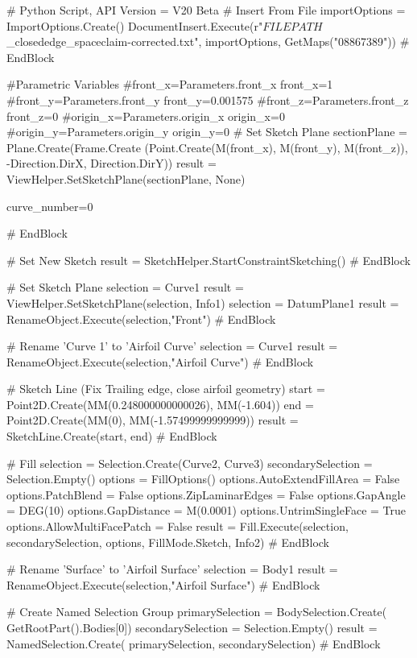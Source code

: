# Python Script, API Version = V20 Beta
# Insert From File
importOptions = ImportOptions.Create()
DocumentInsert.Execute(r"$FILEPATH$
_closededge_spaceclaim-corrected.txt", importOptions, 
GetMaps("08867389"))
# EndBlock

#Parametric Variables
#front_x=Parameters.front_x
front_x=1
#front_y=Parameters.front_y
front_y=0.001575
#front_z=Parameters.front_z
front_z=0
#origin_x=Parameters.origin_x
origin_x=0
#origin_y=Parameters.origin_y
origin_y=0
# Set Sketch Plane
sectionPlane = Plane.Create(Frame.Create
                            (Point.Create(M(front_x), 
                            M(front_y), M(front_z)), 
-Direction.DirX, 
Direction.DirY))
result = ViewHelper.SetSketchPlane(sectionPlane, None)

curve_number=0


# EndBlock


# Set New Sketch
result = SketchHelper.StartConstraintSketching()
# EndBlock

# Set Sketch Plane
selection = Curve1
result = ViewHelper.SetSketchPlane(selection, Info1)
selection = DatumPlane1
result = RenameObject.Execute(selection,"Front")
# EndBlock


# Rename 'Curve 1' to 'Airfoil Curve'
selection = Curve1
result = RenameObject.Execute(selection,"Airfoil Curve")
# EndBlock




# Sketch Line (Fix Trailing edge, close airfoil geometry)
start = Point2D.Create(MM(0.248000000000026), MM(-1.604))
end = Point2D.Create(MM(0), MM(-1.57499999999999))
result = SketchLine.Create(start, end)
# EndBlock


# Fill
selection = Selection.Create(Curve2, Curve3)
secondarySelection = Selection.Empty()
options = FillOptions()
options.AutoExtendFillArea = False
options.PatchBlend = False
options.ZipLaminarEdges = False
options.GapAngle = DEG(10)
options.GapDistance = M(0.0001)
options.UntrimSingleFace = True
options.AllowMultiFacePatch = False
result = Fill.Execute(selection, 
                      secondarySelection, options, 
                      FillMode.Sketch, Info2)
# EndBlock


# Rename 'Surface' to 'Airfoil Surface'
selection = Body1
result = RenameObject.Execute(selection,"Airfoil Surface")
# EndBlock


# Create Named Selection Group
primarySelection = BodySelection.Create(
    GetRootPart().Bodies[0])
secondarySelection = Selection.Empty()
result = NamedSelection.Create(
    primarySelection, secondarySelection)
# EndBlock


